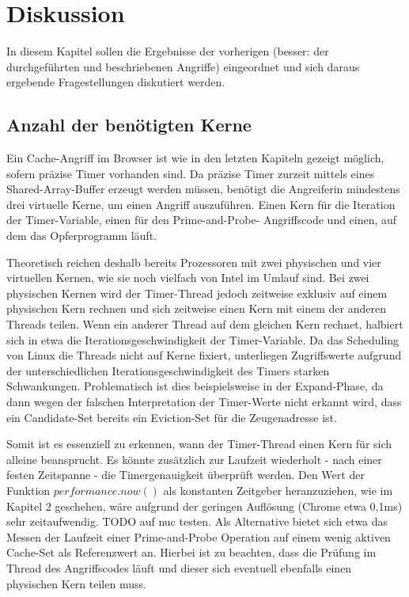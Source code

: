 \chapter{Diskussion}
\label{chapter:discussion}

In diesem Kapitel sollen die Ergebnisse der vorherigen (besser: der durchgeführten und beschriebenen Angriffe) eingeordnet und sich daraus ergebende Fragestellungen diskutiert werden.


\section{Anzahl der benötigten Kerne}

Ein Cache-Angriff im Browser ist wie in den letzten Kapiteln gezeigt möglich, sofern präzise Timer vorhanden sind. Da präzise Timer zurzeit mittels eines Shared-Array-Buffer erzeugt werden müssen, benötigt die Angreiferin mindestens drei virtuelle Kerne, um einen Angriff auszuführen. Einen Kern für die Iteration der Timer-Variable, einen für den Prime-and-Probe- Angriffscode und einen, auf dem das Opferprogramm läuft.

Theoretisch reichen deshalb bereits Prozessoren mit zwei physischen und vier virtuellen Kernen, wie sie noch vielfach von Intel im Umlauf sind. Bei zwei physischen Kernen wird der Timer-Thread jedoch zeitweise exklusiv auf einem physischen Kern rechnen und sich zeitweise einen Kern mit einem der anderen Threads teilen.
Wenn ein anderer Thread auf dem gleichen Kern rechnet, halbiert sich in etwa die Iterationsgeschwindigkeit der Timer-Variable.
Da das Scheduling von Linux die Threads nicht auf Kerne fixiert, unterliegen Zugriffswerte aufgrund der unterschiedlichen Iterationsgeschwindigkeit des Timers starken Schwankungen.
Problematisch ist dies beispielsweise in der Expand-Phase, da dann wegen der falschen Interpretation der Timer-Werte nicht erkannt wird, dass ein Candidate-Set bereits ein Eviction-Set für die Zeugenadresse ist.

Somit ist es essenziell zu erkennen, wann der Timer-Thread einen Kern für sich alleine beansprucht.
Es könnte zusätzlich zur Laufzeit wiederholt - nach einer festen Zeitspanne - die Timergenauigkeit überprüft werden.
Den Wert der Funktion $performance.now()$ als konstanten Zeitgeber heranzuziehen, wie im Kapitel 2 geschehen, wäre aufgrund der geringen Auflösung (Chrome etwa 0,1ms) sehr zeitaufwendig.
TODO auf nuc testen.
Als Alternative bietet sich etwa das Messen der Laufzeit einer Prime-and-Probe Operation auf einem wenig aktiven Cache-Set als Referenzwert an.
Hierbei ist zu beachten, dass die Prüfung im Thread des Angriffscodes läuft und dieser sich eventuell ebenfalls einen physischen Kern teilen muss.

